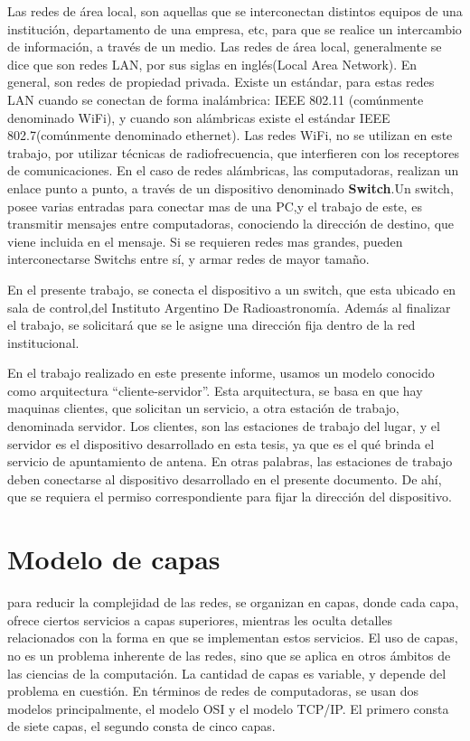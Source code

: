 Las redes de área local, son aquellas que se interconectan distintos equipos de una institución, departamento de una empresa, etc, para que se realice un intercambio de información, a través de un medio. Las redes de área local, generalmente se dice que son redes LAN, por sus siglas en inglés(Local Area Network).  En general, son redes de propiedad privada. Existe un estándar, para estas redes LAN cuando se conectan de forma inalámbrica: IEEE 802.11 (comúnmente denominado WiFi), y cuando son alámbricas existe el estándar IEEE 802.7(comúnmente denominado ethernet). Las redes WiFi, no se utilizan en este trabajo, por utilizar técnicas de radiofrecuencia, que interfieren con los receptores de comunicaciones.  
En el caso de redes alámbricas, las computadoras, realizan un enlace punto a punto, a través de un dispositivo denominado \textbf{Switch}.Un switch, posee varias entradas para conectar mas de una PC,y el trabajo de este, es transmitir mensajes entre computadoras, conociendo la dirección de destino, que viene incluida en el mensaje. Si se requieren redes mas grandes, pueden interconectarse Switchs entre sí, y armar redes de mayor tamaño. 


En el presente trabajo, se conecta el dispositivo a un switch, que esta ubicado en sala de control,del Instituto Argentino De Radioastronomía. Además al finalizar el trabajo, se solicitará que se le asigne una dirección fija dentro de la red institucional.  

En el trabajo realizado en este presente informe, usamos un modelo conocido como arquitectura ``cliente-servidor''. Esta arquitectura, se basa en que hay maquinas clientes, que solicitan un servicio, a otra estación de trabajo, denominada servidor. Los clientes, son las estaciones de trabajo del lugar, y el servidor es el dispositivo desarrollado en esta tesis, ya que es el qué brinda el servicio de apuntamiento de antena. En otras palabras, las estaciones de trabajo deben conectarse al dispositivo desarrollado en el presente documento. De ahí, que se requiera el permiso correspondiente para fijar la dirección del dispositivo.  




\section{Modelo de capas}

para reducir la complejidad de las redes, se organizan en capas, donde cada capa, ofrece ciertos servicios a capas superiores, mientras les oculta detalles relacionados con la forma en que se implementan estos servicios. El uso de capas, no es un problema inherente de las redes, sino que se aplica en otros ámbitos de las ciencias de la computación. La cantidad de capas es variable, y depende del problema en cuestión. En términos de redes de computadoras, se usan dos modelos principalmente, el modelo OSI y el modelo TCP/IP. El primero consta de siete capas, el segundo consta de cinco capas. 

